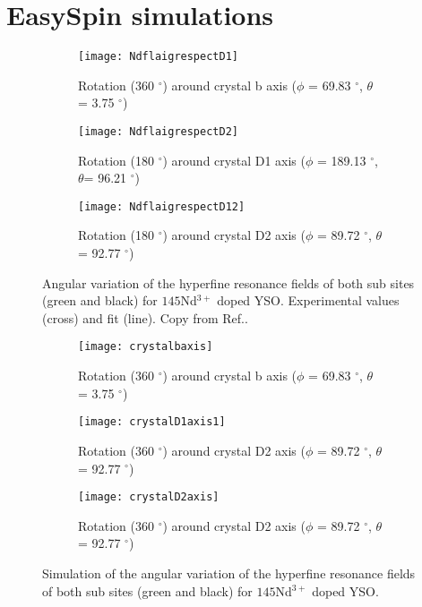 \chapter{\label{sec:easyspinsim}EasySpin simulations}

\begin{figure}[H]
    \centering
    \begin{subfigure}[b]{0.3\textwidth}
        \centering
        \texttt{[image: NdflaigrespectD1]}
        \caption{Rotation (360 $^{\circ}$)
around crystal b axis ($\phi$ = 69.83 $^{\circ}$, $\theta$
= 3.75 $^{\circ}$)}
    \end{subfigure}
    \begin{subfigure}[b]{0.3\textwidth}
        \centering
        \texttt{[image: NdflaigrespectD2]}
   \caption{Rotation (180 $^{\circ}$)
around crystal D1 axis
($\phi$ = 189.13 $^{\circ}$, $\theta$= 96.21 $^{\circ}$)}
   \end{subfigure}
      \begin{subfigure}[b]{0.3\textwidth}
        \centering
        \texttt{[image: NdflaigrespectD12]}
   \caption{Rotation (180 $^{\circ}$)
around crystal D2 axis
($\phi$ = 89.72 $^{\circ}$, $\theta$
= 92.77 $^{\circ}$)}
   \end{subfigure}
   \caption{Angular variation of the hyperfine resonance fields of both sub sites (green and
black) for $145$Nd$^{3+}$ doped YSO. Experimental values (cross) and fit (line). Copy from Ref.\citep{mairflaig}.}
   \label{fig:mairflaigthesis}
    \end{figure}
    
    \begin{figure}[H]
    \centering
    \begin{subfigure}[b]{0.45\textwidth}
        \centering
        \texttt{[image: crystalbaxis]}
        \caption{Rotation (360 $^{\circ}$)
around crystal b axis ($\phi$ = 69.83 $^{\circ}$, $\theta$
= 3.75 $^{\circ}$)}
    \end{subfigure}
    \begin{subfigure}[b]{0.45\textwidth}
        \centering
        \texttt{[image: crystalD1axis1]}
   \caption{Rotation (360 $^{\circ}$)
around crystal D2 axis
($\phi$ = 89.72 $^{\circ}$, $\theta$
= 92.77 $^{\circ}$)}
   \end{subfigure}
      \begin{subfigure}[b]{0.45\textwidth}
        \centering
        \texttt{[image: crystalD2axis]}
   \caption{Rotation (360 $^{\circ}$)
around crystal D2 axis
($\phi$ = 89.72 $^{\circ}$, $\theta$
= 92.77 $^{\circ}$)}
   \end{subfigure}
   \caption{Simulation of the angular variation of the hyperfine resonance fields of both sub sites (green and
black) for $145$Nd$^{3+}$ doped YSO.}
   \label{fig:mairflaigthesisreplicate}
    \end{figure}


